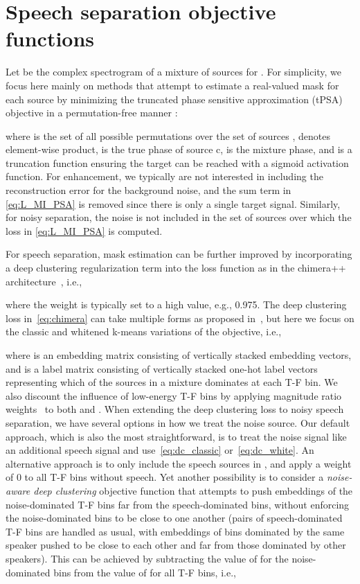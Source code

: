 \documentclass[a4paper]{article}
\begin{document}
\vspace{-0.2cm}
\section{Speech separation objective functions} \vspace{-0.1cm}
\label{sec:objectives}
Let  be the complex spectrogram of a mixture of  sources  for . For simplicity, we focus here mainly on methods that attempt to estimate a real-valued mask for each source  by minimizing the truncated phase sensitive approximation (tPSA) objective \cite{Erdogan2015} in a permutation-free manner \cite{Hershey2016, Isik2016, Kolbaek2017}:

where  is the set of all possible permutations over the set of sources ,  denotes element-wise product,  is the true phase of source c,  is the mixture phase, and  is a truncation function ensuring the target can be reached with a sigmoid activation function.  For enhancement, we typically are not interested in including the reconstruction error for the background noise, and the sum term in \eqref{eq:L_MI_PSA} is removed since there is only a single target signal.  Similarly, for noisy separation, the noise is not included in the set of sources over which the loss in \eqref{eq:L_MI_PSA} is computed.

For speech separation, mask estimation can be further improved by incorporating a deep clustering regularization term into the loss function as in the chimera++ architecture~\cite{Wang2018ICASSP04Alternative}, i.e.,

where the weight  is typically set to a high value, e.g., 0.975.  The deep clustering loss  in~\eqref{eq:chimera} can take multiple forms as proposed in~\cite{Wang2018ICASSP04Alternative}, but here we focus on the classic and whitened k-means variations of the objective, i.e., 

where  is an embedding matrix consisting of vertically stacked embedding vectors, and  is a label matrix consisting of vertically stacked one-hot label vectors representing which of the  sources in a mixture dominates at each T-F bin.  We also discount the influence of low-energy T-F bins by applying magnitude ratio weights~\cite{Wang2018ICASSP04Alternative} to both  and .  When extending the deep clustering loss to noisy speech separation, we have several options in how we treat the noise source. Our default approach, which is also the most straightforward, is to treat the noise signal like an additional speech signal and use~\eqref{eq:dc_classic} or~\eqref{eq:dc_white}.  An alternative approach is to only include the speech sources in , and apply a weight of 0 to all T-F bins without speech. Yet another possibility is to consider a \emph{noise-aware deep clustering} objective function that attempts to push embeddings of the noise-dominated T-F bins far from the speech-dominated bins, without enforcing the noise-dominated bins to be close to one another (pairs of speech-dominated T-F bins are handled as usual, with embeddings of bins dominated by the same speaker pushed to be close to each other and far from those dominated by other speakers).  This can be achieved by subtracting the value of  for the noise-dominated bins from the value of  for all T-F bins, i.e.,
\end{document}
